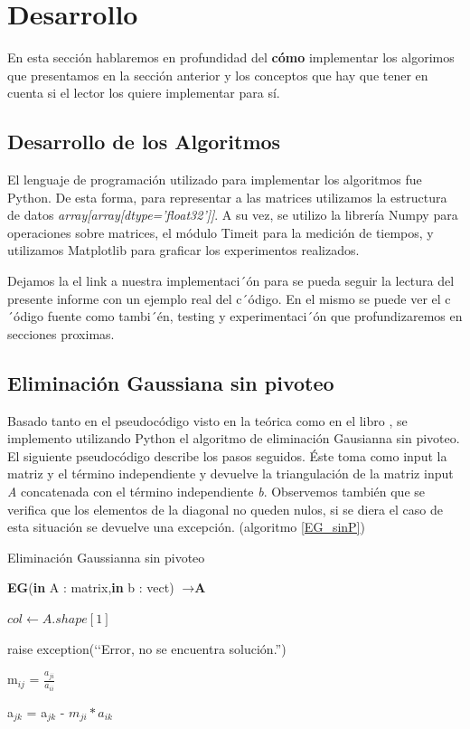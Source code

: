 \section{Desarrollo}

En esta sección hablaremos en profundidad del \textbf{cómo} implementar los algorimos que presentamos en la sección anterior y los conceptos que hay que tener en cuenta si el lector los quiere implementar para sí.

\subsection{Desarrollo de los Algoritmos}

El lenguaje de programación utilizado para implementar los algoritmos fue Python. De esta forma, para representar a las matrices utilizamos la estructura de datos \textit{array[array[dtype='float32']]}. 
A su vez, se utilizo la librería Numpy para operaciones sobre matrices, el módulo Timeit para la medición de tiempos, y utilizamos Matplotlib para graficar los experimentos realizados.

Dejamos la el link a nuestra implementaci´ón \cite{Colab} para se pueda seguir la lectura del presente informe con un ejemplo real del c´ódigo. En el mismo se puede ver el c´ódigo fuente como tambi´én, testing y experimentaci´ón que profundizaremos en secciones proximas.

\subsection{Eliminación Gaussiana sin pivoteo}

Basado tanto en el pseudocódigo visto en la teórica \cite{teoEG} como en el libro \cite{Recipes07}, se implemento utilizando Python el algoritmo de eliminación Gausianna sin pivoteo. 
El siguiente pseudocódigo describe los pasos seguidos. Éste toma como input la matriz y el término independiente y devuelve la triangulación de la matriz input \textit{A} concatenada con el término independiente \textit{b}. Observemos también que se verifica que los elementos de la diagonal no queden nulos, si se diera el caso de esta situación se devuelve una excepción. (algoritmo \ref{EG_sinP})


\begin{algorithm}
\caption{Eliminación Gaussianna sin pivoteo}\label{EG_sinP}
\begin{algorithmic}
\State \textbf{EG}(\textbf{in} A : matrix,\textbf{in} b : vect) $\to \textbf{A}$
 
 \State $col \gets A.shape[1]$
 
        \State  raise exception(‘‘Error, no se encuentra solución.'') 
    \EndIf


    \State m$_{ij}$ = $\frac{a_{ji}}{a_{ii}}$
    
        \State a$_{jk}$ = a$_{jk}$ - $m_{ji}*{a_{ik}}$
    \EndFor

\EndFor
\EndFor
\end{algorithmic}
\end{algorithm}

